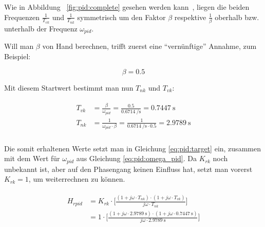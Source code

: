 Wie in Abbildung ~\ref{fig:pid:complete} gesehen werden kann~\footnotemark[8],
liegen  die   beiden  Frequenzen  $\frac{1}{T_{vk}}$   und  $\frac{1}{T_{nk}}$
symmetrisch um  den Faktor $\beta$ respektive  $\frac{1}{\beta}$ oberhalb bzw.
unterhalb der Frequenz $\omega_{pid}$.



Will  man $\beta$  von Hand  berechnen, trifft  zuerst eine  ``vern\"unftige''
Annahme, zum Beispiel:

\begin{equation} \label{eq:pid:beta:initial_value}
    \beta = 0.5
\end{equation}

Mit  diesem Startwert  bestimmt  man nun  $T_{nk}$  und ${T_{vk}}$:

\begin{gather} \label{eq:pid:t_nk_t_vk_initial_results}
    \begin{split}
        {T_{vk}} & = \frac{\beta}{\omega_{pid}}  = \frac{0.5}{\SI{0.6714}{\per\second}}                   = \SI{0.7447}{\second} \\
        {T_{nk}} & = \frac{1}{\omega_{pid} \cdot \beta} = \frac{1}{\SI{0.6714}{\per\second} \cdot 0.5 }  = \SI{2.9789}{\second} \\
    \end{split}
\end{gather}

Die  somit  erhaltenen  Werte   setzt  man  in  Gleichung  \ref{eq:pid:target}
ein,   zusammen   mit   dem    Wert   f\"ur   $\omega_{pid}$   aus   Gleichung
\ref{eq:pid:omega_pid}. Da  $K_{rk}$   noch  unbekannt   ist,  aber   auf  den
Phasengang  keinen  Einfluss   hat,  setzt  man  vorerst  $K_{rk}   =  1$,  um
weiterrechnen zu k\"onnen.

\begin{gather} \label{eq:pid:t_nk_t_vk_initial_results}
    \begin{split}
        H_{rpid} & = K_{rk} \cdot \biggl[ \frac{(1 + j\omega \cdot T_{nk}) \cdot (1 + j\omega \cdot T_{vk}) }{ j\omega \cdot T_{nk} } \biggr] \\
                 & = 1      \cdot \biggl[ \frac{(1 + j\omega \cdot \SI{2.9789}{\second}) \cdot (1 + j\omega \cdot \SI{0.7447}{\second}) }{ j\omega \cdot  \SI{2.9789}{\second}} \biggr]
    \end{split}
\end{gather}

